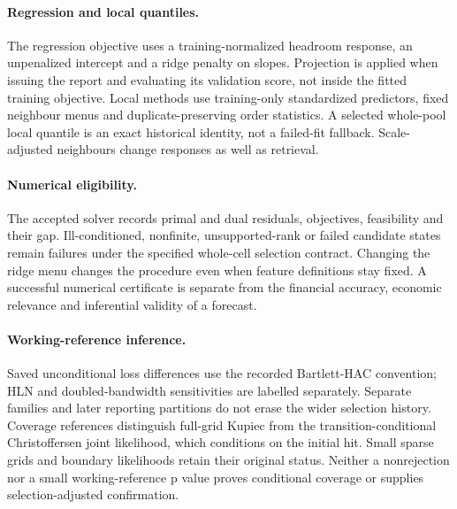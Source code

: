 \documentclass[11pt,a4paper]{article}
\begin{document}
\paragraph{Regression and local quantiles.}
The regression objective uses a training-normalized headroom response, an
unpenalized intercept and a ridge penalty on slopes. Projection is applied when
issuing the report and evaluating its validation score, not inside the fitted
training objective. Local methods use training-only standardized predictors,
fixed neighbour menus and duplicate-preserving order statistics. A selected
whole-pool local quantile is an exact historical identity, not a failed-fit
fallback. Scale-adjusted neighbours change responses as well as retrieval.

\paragraph{Numerical eligibility.}
The accepted solver records primal and dual residuals, objectives, feasibility
and their gap. Ill-conditioned, nonfinite, unsupported-rank or failed candidate
states remain failures under the specified whole-cell selection contract.
Changing the ridge menu changes the procedure even when feature definitions
stay fixed. A successful numerical certificate is separate from the financial
accuracy, economic relevance and inferential validity of a forecast.

\paragraph{Working-reference inference.}
Saved unconditional loss differences use the recorded Bartlett-HAC convention;
HLN and doubled-bandwidth sensitivities are labelled separately. Separate
families and later reporting partitions do not erase the wider selection
history. Coverage references distinguish full-grid Kupiec from the
transition-conditional Christoffersen joint likelihood, which conditions on
the initial hit. Small sparse grids and boundary likelihoods retain their
original status. Neither a nonrejection nor a small working-reference p value
proves conditional coverage or supplies selection-adjusted confirmation.
\end{document}
